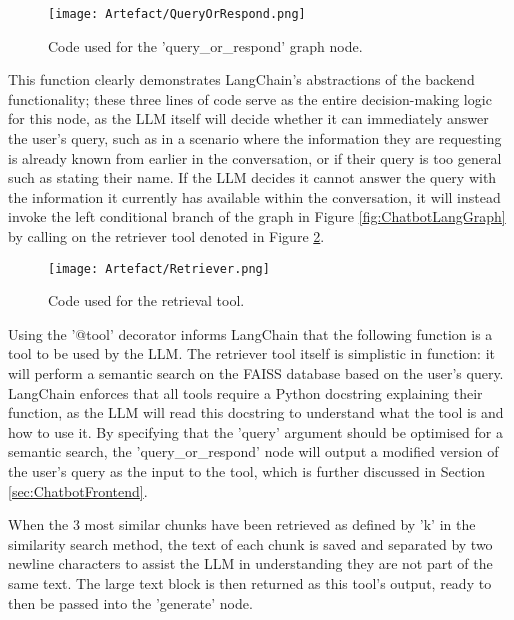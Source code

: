 \begin{figure}[H]
    \centering
    \texttt{[image: Artefact/QueryOrRespond.png]}
    \caption{Code used for the 'query\_or\_respond' graph node. \label{fig:QueryOrRespond}}
\end{figure}

\noindent This function clearly demonstrates LangChain's abstractions of the backend functionality; these three lines of code
serve as the entire decision-making logic for this node, as the LLM itself will decide whether it can immediately answer the user's query,
such as in a scenario where the information they are requesting is already known from earlier in the conversation, or if their query is too 
general such as stating their name. If the LLM decides it cannot answer the query with the information it currently has available within 
the conversation, it will instead invoke the left conditional branch of the graph in Figure \ref{fig:ChatbotLangGraph} by calling on the 
retriever tool denoted in Figure \ref{fig:RetrieverTool}.

\begin{figure}[H]
    \centering
    \texttt{[image: Artefact/Retriever.png]}
    \caption{Code used for the retrieval tool. \label{fig:RetrieverTool}}
\end{figure}

\noindent Using the '@tool' decorator informs LangChain that the following function is a tool to be used by the LLM.
The retriever tool itself is simplistic 
in function: it will perform a semantic search on the FAISS database based on the user's query. LangChain enforces that all 
tools require a Python docstring explaining their function, as the LLM will read this docstring to understand what the tool 
is and how to use it. By specifying that the 'query' argument should be optimised for a semantic search, the 'query\_or\_respond'
node will output a modified version of the user's query as the input to the tool, which is further discussed in Section 
\ref{sec:ChatbotFrontend}. 

\para When the 3 most similar chunks have been retrieved as defined by 'k' in the similarity search method, the text of each chunk 
is saved and separated by two newline characters to assist the LLM in understanding they are not part of the same text. The large 
text block is then returned as this tool's output, ready to then be passed into the 'generate' node. 

